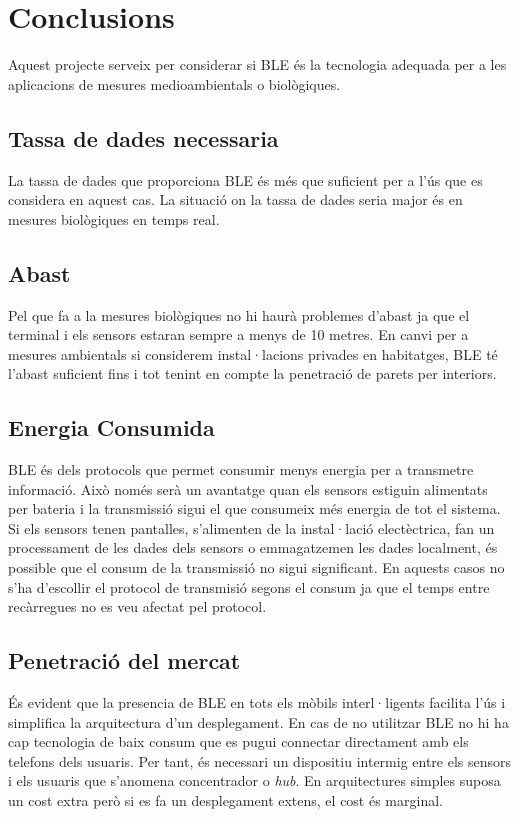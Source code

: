 \cleardoublepage
{}
\chapter*{Conclusions}

Aquest projecte serveix per considerar si BLE és la tecnologia adequada per a les aplicacions de mesures medioambientals o biològiques.

\section{Tassa de dades necessaria}

La tassa de dades que proporciona BLE és més que suficient per a l'ús que es considera en aquest cas.
La situació on la tassa de dades seria major és en mesures biològiques en temps real.

\section{Abast}

Pel que fa a la mesures biològiques no hi haurà problemes d'abast ja que el terminal i els sensors estaran sempre a menys de 10 metres.
En canvi per a mesures ambientals si considerem instal·lacions privades en habitatges, BLE té l'abast suficient fins i tot tenint en compte la penetració de parets per interiors.

\section{Energia Consumida}

BLE és dels protocols que permet consumir menys energia per a transmetre informació.
Això només serà un avantatge quan els sensors estiguin alimentats per bateria i la transmissió sigui el que consumeix més energia de tot el sistema.
Si els sensors tenen pantalles, s'alimenten de la instal·lació electèctrica, fan un processament de les dades dels sensors o emmagatzemen les dades localment, és possible que el consum de la transmissió no sigui significant.
En aquests casos no s'ha d'escollir el protocol de transmisió segons el consum ja que el temps entre recàrregues no es veu afectat pel protocol.

\section{Penetració del mercat}

És evident que la presencia de BLE en tots els mòbils interl·ligents facilita l'ús i simplifica la arquitectura d'un desplegament.
En cas de no utilitzar BLE no hi ha cap tecnologia de baix consum que es pugui connectar directament amb els telefons dels usuaris.
Per tant, és necessari un dispositiu intermig entre els sensors i els usuaris que s'anomena concentrador o \textit{hub}.
En arquitectures simples suposa un cost extra però si es fa un desplegament extens, el cost és marginal.

